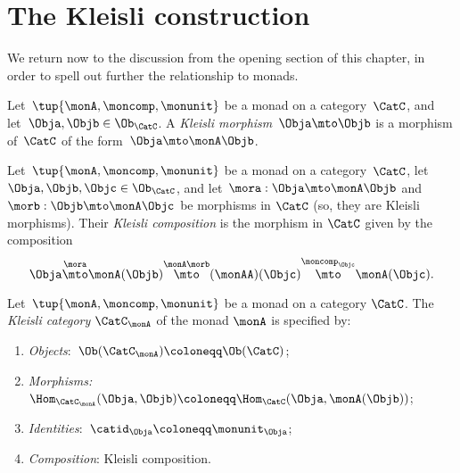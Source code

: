 
\section{The Kleisli construction}
\label{sec:Kleisli}

We return now to the discussion from the opening section of this chapter, in order to spell out further the relationship to monads.

\begin{ctdefinition}
	\label{def:kleislimor}
	Let~$\tup{\monA, \moncomp, \monunit}$ be a monad on a category~$\CatC$, and let~$\Obja, \Objb \in \Ob_\CatC$.
	A
	\emph{Kleisli morphism}~$\Obja \mto \Objb$ is a morphism of~$\CatC$ of the form~$\Obja \mto \monA \Objb$.
\end{ctdefinition}

\begin{ctdefinition}
	\label{def:kleislicomp}
	Let~$\tup{\monA, \moncomp, \monunit}$ be a monad on a category~$\CatC$, let~$\Obja, \Objb, \Objc \in \Ob_\CatC$,  and let~$\mora : \Obja \mto \monA \Objb$ and $\morb : \Objb \mto \monA \Objc$ be morphisms in $\CatC$ (so, they are Kleisli morphisms).
	Their \emph{Kleisli composition} is the morphism in $\CatC$ given by the composition
	\begin{equation}
		\Obja \overset{\mora}{\mto} \monA(\Objb) \overset{\monA \morb}{\mto} (\monAA)(\Objc) \overset{\moncomp_\Objc}{\mto} \monA(\Objc).
	\end{equation}
\end{ctdefinition}

\begin{ctdefinition}
	\label{def:kleislicat}
	Let~$\tup{\monA, \moncomp, \monunit}$ be a monad on a category $\CatC$.
	The \emph{Kleisli category} $\CatC_\monA$ of the monad $\monA$ is specified by:
	\begin{enumerate}
		\item \emph{Objects}:~$\Ob(\CatC_\monA) \coloneqq \Ob(\CatC)$;
		\item \emph{Morphisms:}~$\Hom_{\CatC_\monA}(\Obja, \Objb) \coloneqq \Hom_{\CatC}(\Obja, \monA(\Objb))$;
		\item \emph{Identities}:~$\catid_\Obja \coloneqq \monunit_\Obja$;
		\item \emph{Composition}: Kleisli composition.
	\end{enumerate}
\end{ctdefinition}

